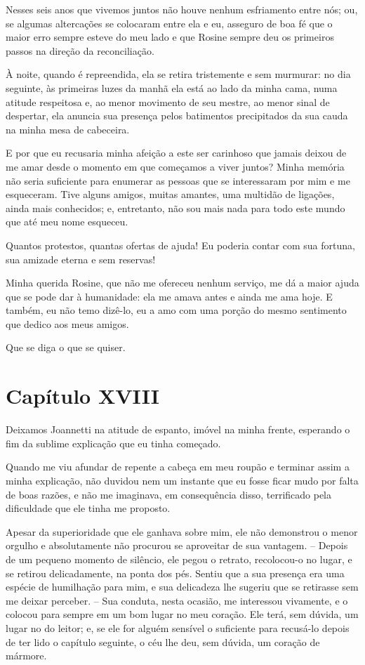  Nesses seis anos que vivemos juntos não houve nenhum esfriamento entre
nós; ou, se algumas altercações se colocaram entre ela e eu, asseguro
de boa fé que o maior erro sempre esteve do meu lado e que Rosine
sempre deu os primeiros passos na direção da reconciliação.

 À noite, quando é repreendida, ela se retira tristemente e sem
murmurar: no dia seguinte, às primeiras luzes da manhã ela está ao lado
da minha cama, numa atitude respeitosa e, ao menor movimento de seu
mestre, ao menor sinal de despertar, ela anuncia sua presença pelos
batimentos precipitados da sua cauda na minha mesa de cabeceira.

 E por que eu recusaria minha afeição a este ser carinhoso que jamais
deixou de me amar desde o momento em que começamos a viver juntos?
Minha memória não seria suficiente para enumerar as pessoas que se
interessaram por mim e me esqueceram. Tive alguns amigos, muitas
amantes, uma multidão de ligações, ainda mais conhecidos; e,
entretanto, não sou mais nada para todo este mundo que até meu nome
esqueceu.

 Quantos protestos, quantas ofertas de ajuda! Eu poderia contar com sua
fortuna, sua amizade eterna e sem reservas!

 Minha querida Rosine, que não me ofereceu nenhum serviço, me dá a maior
ajuda que se pode dar à humanidade: ela me amava antes e ainda me ama
hoje. E também, eu não temo dizê-lo, eu a amo com uma porção do mesmo
sentimento que dedico aos meus amigos.

 Que se diga o que se quiser.

\section{Capítulo XVIII}

 Deixamos Joannetti na atitude de espanto, imóvel na minha frente,
esperando o fim da sublime explicação que eu tinha começado.

 Quando me viu afundar de repente a cabeça em meu roupão e terminar
assim a minha explicação, não duvidou nem um instante que eu fosse
ficar mudo por falta de boas razões, e não me imaginava, em
consequência disso, terrificado pela dificuldade que ele tinha me
proposto.

  Apesar da superioridade que ele ganhava sobre mim, ele não demonstrou
o menor orgulho e absolutamente não procurou se aproveitar de sua
vantagem. -- Depois de um pequeno momento de silêncio, ele pegou o
retrato, recolocou-o no lugar, e se retirou delicadamente, na ponta dos
pés. Sentiu que a sua presença era uma espécie de humilhação para mim,
e sua delicadeza lhe sugeriu que se retirasse sem me deixar perceber.
-- Sua conduta, nesta ocasião, me interessou vivamente, e o colocou
para sempre em um bom lugar no meu coração. Ele terá, sem dúvida, um
lugar no do leitor; e, se ele for alguém sensível o suficiente para
recusá-lo depois de ter lido o capítulo seguinte, o céu lhe deu, sem
dúvida, um coração de mármore.

